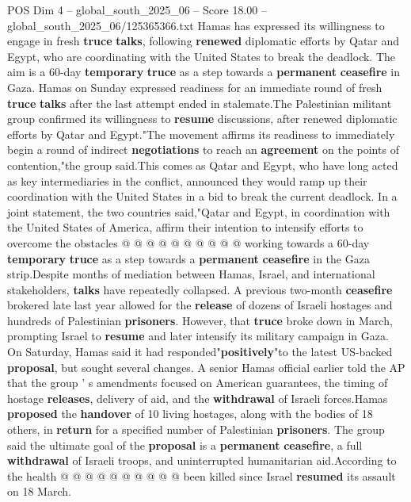 \begin{textsample}{POS Dim 4 – global\_south\_2025\_06 – Score 18.00 – global\_south\_2025\_06/125365366.txt}  \label{ex:f4_pos_357}
Hamas has expressed its willingness to engage in fresh \textbf{truce} \textbf{talks}, following \textbf{renewed} diplomatic efforts by Qatar and Egypt, who are coordinating with the United States to break the deadlock.
The aim is a 60-day \textbf{temporary} \textbf{truce} as a step towards a \textbf{permanent} \textbf{ceasefire} in Gaza.
Hamas on Sunday expressed readiness for an immediate round of fresh \textbf{truce} \textbf{talks} after the last attempt ended in stalemate.The Palestinian militant group confirmed its willingness to \textbf{resume} discussions, after renewed diplomatic efforts by Qatar and Egypt."The movement affirms its readiness to immediately begin a round of indirect \textbf{negotiations} to reach an \textbf{agreement} on the points of contention,"the group said.This comes as Qatar and Egypt, who have long acted as key intermediaries in the conflict, announced they would ramp up their coordination with the United States in a bid to break the current deadlock.
In a joint statement, the two countries said,"Qatar and Egypt, in coordination with the United States of America, affirm their intention to intensify efforts to overcome the obstacles @ @ @ @ @ @ @ @ @ @ working towards a 60-day \textbf{temporary} \textbf{truce} as a step towards a \textbf{permanent} \textbf{ceasefire} in the Gaza strip.Despite months of mediation between Hamas, Israel, and international stakeholders, \textbf{talks} have repeatedly collapsed.
A previous two-month \textbf{ceasefire} brokered late last year allowed for the \textbf{release} of dozens of Israeli hostages and hundreds of Palestinian \textbf{prisoners}.
However, that \textbf{truce} broke down in March, prompting Israel to \textbf{resume} and later intensify its military campaign in Gaza.
On Saturday, Hamas said it had responded"\textbf{positively}"to the latest US-backed \textbf{proposal}, but sought several changes.
A senior Hamas official earlier told the AP that the group ' s amendments focused on American guarantees, the timing of hostage \textbf{releases}, delivery of aid, and the \textbf{withdrawal} of Israeli forces.Hamas \textbf{proposed} the \textbf{handover} of 10 living hostages, along with the bodies of 18 others, in \textbf{return} for a specified number of Palestinian \textbf{prisoners}.
The group said the ultimate goal of the \textbf{proposal} is a \textbf{permanent} \textbf{ceasefire}, a full \textbf{withdrawal} of Israeli troops, and uninterrupted humanitarian aid.According to the health @ @ @ @ @ @ @ @ @ @ been killed since Israel \textbf{resumed} its assault on 18 March.

\end{textsample}
